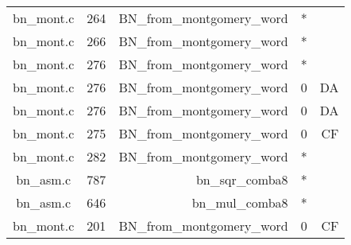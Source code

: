 \begin{table*}
\begin{tabular}{clrrr}
bn\_mont.c&264&BN\_from\_montgomery\_word&*&\\
bn\_mont.c&266&BN\_from\_montgomery\_word&*&\\
bn\_mont.c&276&BN\_from\_montgomery\_word&*&\\
bn\_mont.c&276&BN\_from\_montgomery\_word&0 &DA\\
bn\_mont.c&276&BN\_from\_montgomery\_word&0 &DA\\
bn\_mont.c&275&BN\_from\_montgomery\_word&0 &CF\\
bn\_mont.c&282&BN\_from\_montgomery\_word&*&\\
bn\_asm.c&787&bn\_sqr\_comba8&*&\\
bn\_asm.c&646&bn\_mul\_comba8&*&\\
bn\_mont.c&201&BN\_from\_montgomery\_word&0 &CF\\
\hline
\end{tabular}
\end{table*}